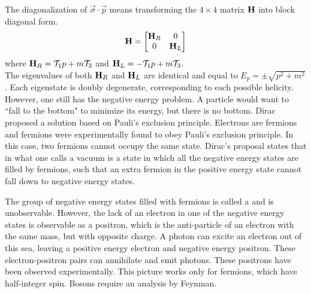 \documentclass[12pt,a4paper,titlepage]{article}
\newcommand{\ul}[1]{\underline{\smash{#1}}} %
\newcommand{\Tau}{\mathcal{T}} %
\begin{document}
The diagonalization of $\vec{\sigma}\cdot\vec{p}$ means transforming the $4\times 4$ matrix $\vb{H}$ into block diagonal form.
\begin{equation}
\vb{H}=\mqty[\vb{H}_{R} & 0 \\ 0 & \vb{H}_{L}]
\end{equation}
where $\vb{H}_{R}=\Tau_{1}p+m\Tau_{3}$ and $\vb{H}_{L}=-\Tau_{1}p+m\Tau_{3}$.\\

The eigenvalues of both $\vb{H}_{R}$ and $\vb{H}_{L}$ are identical and equal to $E_{p}=\pm\sqrt{p^{2}+m^{2}}$. Each eigenstate is doubly degenerate, corresponding to each possible helicity. However, one still has the negative energy problem. A particle would want to ``fall to the bottom" to minimize its energy, but there is no bottom. Dirac proposed a solution based on Pauli's exclusion principle. Electrons are fermions and fermions were experimentally found to obey Pauli's exclusion principle. In this case, two fermions cannot occupy the same state. Dirac's proposal states that in what one calls a vacuum is a state in which all the negative energy states are filled by fermions, such that an extra fermion in the positive energy state cannot fall down to negative energy states.
\begin{center}
\end{center}
The group of negative energy states filled with fermions is called a \ul{Dirac} \ul{negative energy sea} and is unobservable. However, the lack of an electron in one of the negative energy states is observable as a positron, which is the anti-particle of an electron with the same mass, but with opposite charge. A photon can excite an electron out of this sea, leaving a positive energy electron and negative energy positron. These electron-positron pairs can annihilate and emit photons. These positrons have been observed experimentally. This picture works only for fermions, which have half-integer spin. Bosons require an analysis by Feynman.
\end{document}
